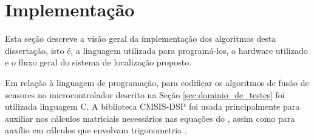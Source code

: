 \documentclass[acronym, symbols, table, deposito]{fei}
\begin{document}
%	
%		
%		
%		
		
	\section{Implementação}
	
		Esta seção descreve a visão geral da implementação dos algoritmos desta dissertação, isto é, a linguagem utilizada para programá-los, o hardware utilizado e o fluxo geral do sistema de localização proposto.
		
		Em relação à linguagem de programação, para codificar os algoritmos de fusão de sensores no microcontrolador descrito na Seção \ref{sec:dominio_de_testes} foi utilizada linguagem C. A biblioteca CMSIS-DSP foi usada principalmente para auxiliar nos cálculos matriciais necessários nas equações do , assim como para auxílio em cálculos que envolvam trigonometria \cite{cmsis_dsp}.
		
\end{document}
